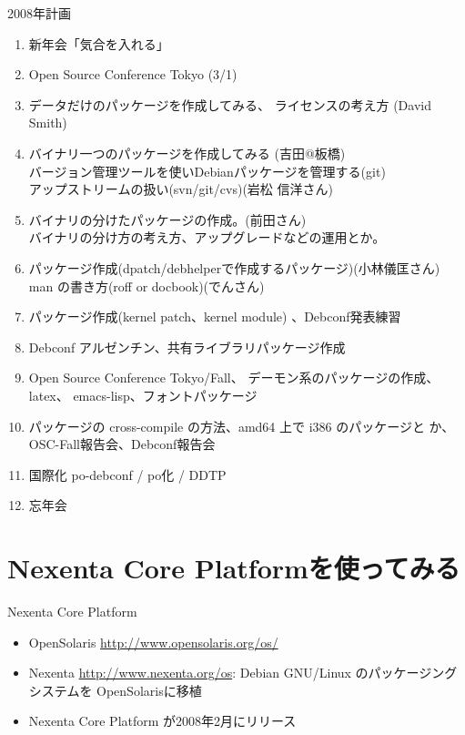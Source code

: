 \documentclass[cjk,dvipdfmx,12pt]{beamer}
\begin{document}
\begin{frame}{2008年計画}

{\scriptsize
\begin{enumerate}
 \item 新年会「気合を入れる」
 \item Open Source Conference Tokyo (3/1)
 \item データだけのパッケージを作成してみる、
       ライセンスの考え方 (David Smith)
 \item バイナリ一つのパッケージを作成してみる (吉田@板橋)\\
       バージョン管理ツールを使いDebianパッケージを管理する(git)\\
       アップストリームの扱い(svn/git/cvs)(岩松 信洋さん)
 \item バイナリの分けたパッケージの作成。(前田さん)\\
       バイナリの分け方の考え方、アップグレードなどの運用とか。
 \item パッケージ作成(dpatch/debhelperで作成するパッケージ)(小林儀匡さん)\\
       man の書き方(roff or docbook)(でんさん)
 \item パッケージ作成(kernel patch、kernel module)
       、Debconf発表練習
 \item Debconf アルゼンチン、共有ライブラリパッケージ作成

 \item Open Source Conference Tokyo/Fall、
       デーモン系のパッケージの作成、latex、 emacs-lisp、フォントパッケージ
 \item パッケージの cross-compile の方法、amd64 上で i386 のパッケージと
       か、OSC-Fall報告会、Debconf報告会
 \item 国際化 po-debconf / po化 / DDTP
 \item 忘年会
\end{enumerate}
}
\end{frame}


\section{Nexenta Core Platformを使ってみる}

\begin{frame}{Nexenta Core Platform}
\begin{itemize}
 \item  OpenSolaris \url{http://www.opensolaris.org/os/}
 \item  Nexenta \url{http://www.nexenta.org/os}:
	Debian GNU/Linux のパッケージングシステムを OpenSolarisに移植
 \item Nexenta Core Platform が2008年2月にリリース
\end{itemize}

\end{frame}
\end{document}
